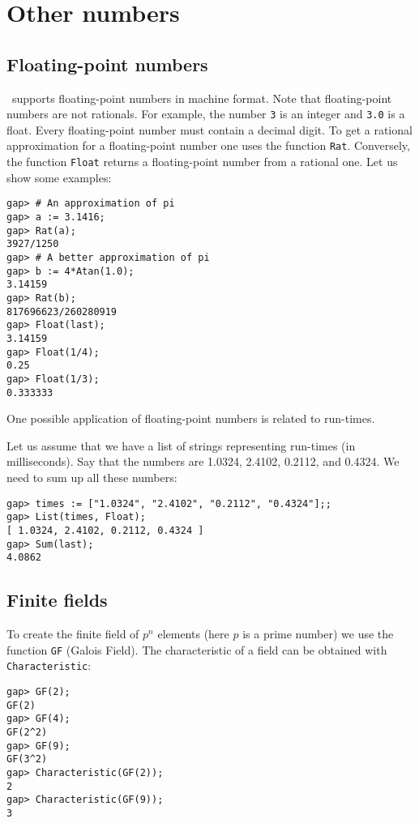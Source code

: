\section{Other numbers}

\subsection{Floating-point numbers}

\GAP~supports floating-point numbers in machine format. 
Note that floating-point numbers
are not rationals. For example,
the number \lstinline{3} is an integer and 
\lstinline{3.0} is a float. Every floating-point number
must contain a decimal digit. To get a rational 
approximation for a floating-point number one uses 
the function \lstinline{Rat}. Conversely, the function
\lstinline{Float} returns a 
floating-point number from a rational one.   
Let us show some examples:
\begin{lstlisting}
gap> # An approximation of pi
gap> a := 3.1416;     
gap> Rat(a);
3927/1250
gap> # A better approximation of pi
gap> b := 4*Atan(1.0);
3.14159
gap> Rat(b);
817696623/260280919
gap> Float(last);
3.14159
gap> Float(1/4);
0.25
gap> Float(1/3);
0.333333
\end{lstlisting}

One possible application of floating-point numbers
is related to run-times. 

\begin{example}
    Let us assume that we have a list 
    of strings representing run-times (in milliseconds). 
    Say that 
    the numbers are 
    1.0324, 2.4102, 0.2112, and 0.4324. We need to sum up all these numbers:
\begin{lstlisting}
gap> times := ["1.0324", "2.4102", "0.2112", "0.4324"];;
gap> List(times, Float);
[ 1.0324, 2.4102, 0.2112, 0.4324 ]
gap> Sum(last);
4.0862    
\end{lstlisting}
\end{example}

\label{section:cyclotomics}

\subsection{Finite fields}

To create the finite field of $p^n$
elements (here $p$ is a prime number) 
we use the function \lstinline{GF} (Galois Field).  The
characteristic of a field can be obtained with \lstinline{Characteristic}: 
\begin{lstlisting}
gap> GF(2);
GF(2)
gap> GF(4);
GF(2^2)
gap> GF(9);
GF(3^2)
gap> Characteristic(GF(2));
2
gap> Characteristic(GF(9));
3
\end{lstlisting}

